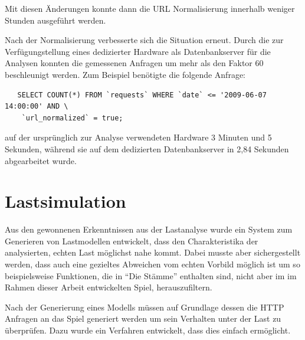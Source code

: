 \documentclass[10pt]{scrartcl}
\begin{document}
Mit diesen Änderungen konnte dann die URL Normalisierung innerhalb weniger Stunden ausgeführt werden.

Nach der Normalisierung verbesserte sich die Situation erneut. Durch die zur Verfügungstellung eines dedizierter Hardware als Datenbankserver für die Analysen konnten die gemessenen Anfragen um mehr als den Faktor 60 beschleunigt werden. Zum Beispiel benötigte die folgende Anfrage:

\begin{verbatim}
   SELECT COUNT(*) FROM `requests` WHERE `date` <= '2009-06-07 14:00:00' AND \
    `url_normalized` = true;
\end{verbatim}

auf der ursprünglich zur Analyse verwendeten Hardware 3 Minuten und 5 Sekunden, während sie auf dem dedizierten Datenbankserver in 2,84 Sekunden abgearbeitet wurde.





  \section{Lastsimulation}
  Aus den gewonnenen Erkenntnissen aus der Lastanalyse wurde ein System zum Generieren von Lastmodellen entwickelt, dass den Charakteristika der analysierten, echten Last möglichst nahe kommt. Dabei musste aber sichergestellt werden, dass auch eine gezieltes Abweichen vom echten Vorbild möglich ist um so beispielsweise Funktionen, die in ``Die Stämme'' enthalten sind, nicht aber im im Rahmen dieser Arbeit entwickelten Spiel, herauszufiltern.
  
  Nach der Generierung eines Modells müssen auf Grundlage dessen die HTTP Anfragen an das Spiel generiert werden um sein Verhalten unter der Last zu überprüfen. Dazu wurde ein Verfahren entwickelt, dass dies einfach ermöglicht.
  
\end{document}
